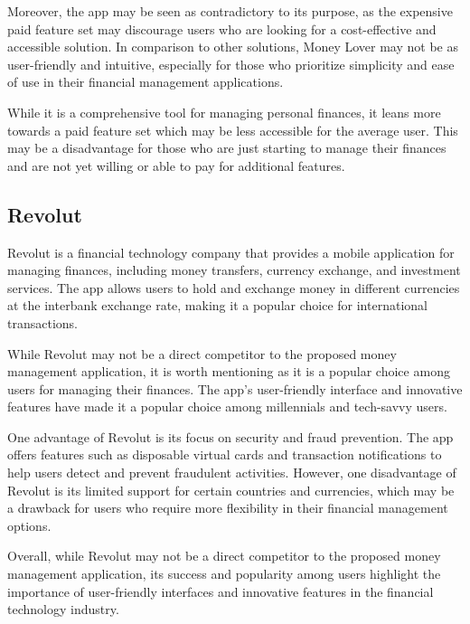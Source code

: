 \hspace{\parindent}Moreover, the app may be seen as contradictory to its purpose, as the expensive paid feature set may discourage users who are looking for a cost-effective and accessible solution. In comparison to other solutions, Money Lover may not be as user-friendly and intuitive, especially for those who prioritize simplicity and ease of use in their financial management applications.

\hspace{\parindent}While it is a comprehensive tool for managing personal finances, it leans more towards a paid feature set which may be less accessible for the average user. This may be a disadvantage for those who are just starting to manage their finances and are not yet willing or able to pay for additional features.



\subsection{Revolut}
\hspace{\parindent}Revolut is a financial technology company that provides a mobile application for managing finances, including money transfers, currency exchange, and investment services. The app allows users to hold and exchange money in different currencies at the interbank exchange rate, making it a popular choice for international transactions.

\hspace{\parindent}While Revolut may not be a direct competitor to the proposed money management application, it is worth mentioning as it is a popular choice among users for managing their finances. The app's user-friendly interface and innovative features have made it a popular choice among millennials and tech-savvy users.

\hspace{\parindent}One advantage of Revolut is its focus on security and fraud prevention. The app offers features such as disposable virtual cards and transaction notifications to help users detect and prevent fraudulent activities. However, one disadvantage of Revolut is its limited support for certain countries and currencies, which may be a drawback for users who require more flexibility in their financial management options.

\hspace{\parindent}Overall, while Revolut may not be a direct competitor to the proposed money management application, its success and popularity among users highlight the importance of user-friendly interfaces and innovative features in the financial technology industry.
